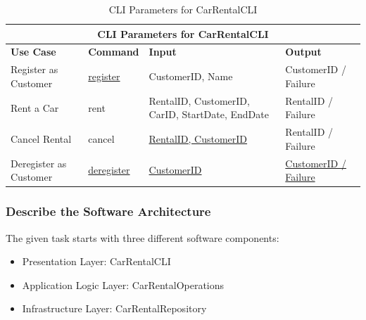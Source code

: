 \begin{table}
      \centering
      \caption{CLI Parameters for CarRentalCLI}
      \label{tab:cli_parameters_car_rental_cli}
      \begin{tabular}{|p{4cm}|p{2cm}|p{4cm}|p{5cm}|}
            \hline
            \multicolumn{4}{|c|}{\textbf{CLI Parameters for CarRentalCLI}} \\
            \hline
            \textbf{Use Case} & \textbf{Command} & \textbf{Input} & \textbf{Output} \\
            \hline
            Register as Customer & \underline{register} & CustomerID, Name & CustomerID / Failure \\
            \hline
            Rent a Car & rent & RentalID, CustomerID, CarID, StartDate, EndDate & RentalID / Failure \\
            \hline
            Cancel Rental & cancel & \underline{RentalID, CustomerID} & RentalID / Failure \\
            \hline
            Deregister as Customer & \underline{deregister} & \underline{CustomerID} & \underline{CustomerID / Failure} \\
            \hline
      \end{tabular}
\end{table}

\subsubsection*{Describe the Software Architecture}
The given task starts with three different software components:
\begin{itemize}
    \item Presentation Layer: CarRentalCLI
    \item Application Logic Layer: CarRentalOperations
    \item Infrastructure Layer: CarRentalRepository
\end{itemize}
